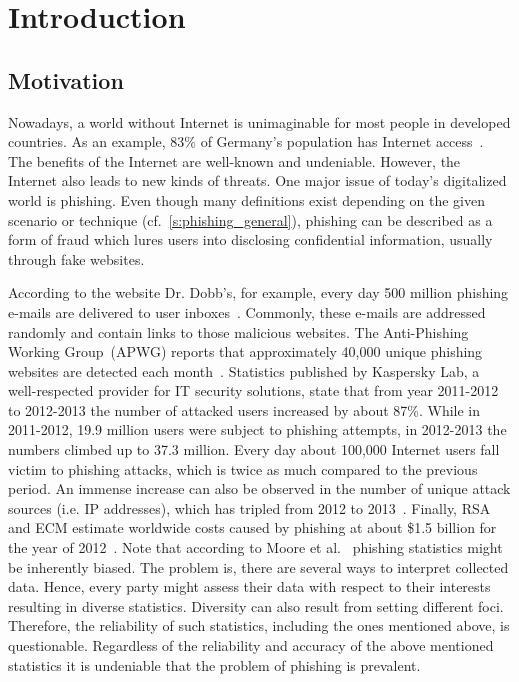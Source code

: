 \section{Introduction}
\label{s:introduction}

\subsection{Motivation}
Nowadays, a world without Internet is unimaginable for most people in developed countries.
As an example, 83\% of Germany's population has Internet access~\cite{globalfinance2012internetusage}. 
The benefits of the Internet are well-known and undeniable.
However, the Internet also leads to new kinds of threats.
One major issue of today's digitalized world is phishing. 
Even though many definitions exist depending on the given scenario or technique (cf.~\autoref{s:phishing_general}), phishing can be described as a form of fraud which lures users into disclosing confidential information, usually through fake websites.

According to the website Dr. Dobb's, for example, every day 500 million phishing e-mails are delivered to user inboxes~\cite{drdobb2012email}.
Commonly, these e-mails are addressed randomly and contain links to those malicious websites.
The Anti-Phishing Working Group~(APWG) reports that approximately 40,000 unique phishing websites are detected each month~\cite{antiphishingtrendreport2013}. Statistics published by Kaspersky Lab, a well-respected provider for IT security solutions, state that from year 2011-2012 to 2012-2013 the number of attacked users increased by about 87\%. 
While in 2011-2012, 19.9 million users were subject to phishing attempts, in 2012-2013 the numbers climbed up to 37.3 million. 
 Every day about 100,000 Internet users fall victim to phishing attacks, which is twice as much compared to the previous period. An immense increase can also be observed in the number of unique attack sources (i.e. IP addresses), which has tripled from 2012 to 2013~\cite{kasperskyreport2013}. 
Finally, RSA and ECM estimate worldwide costs caused by phishing at about \$1.5 billion for the year of 2012~\cite{rsa2013}. Note that according to Moore et al.~\cite{moore2010hard} phishing statistics might be inherently biased. 
The problem is, there are several ways to interpret collected data. 
Hence, every party might assess their data with respect to their interests resulting in diverse statistics. 
Diversity can also result from setting different foci.
Therefore, the reliability of such statistics, including the ones mentioned above, is questionable. 
Regardless of the reliability and accuracy of the above mentioned statistics it is undeniable that the problem of phishing is prevalent.

